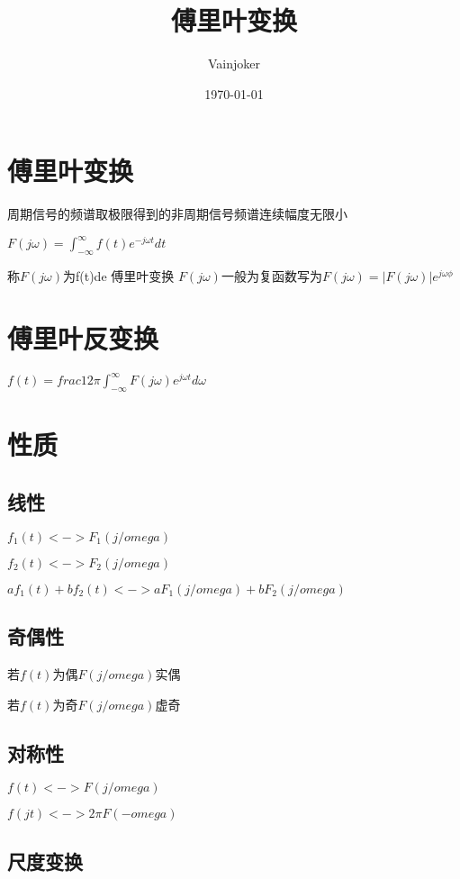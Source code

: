 \documentclass{article}
\title{傅里叶变换}
\author{Vainjoker}
\date{\today}
\begin{document}
    \maketitle
    \newpage


\section{傅里叶变换}

周期信号的频谱取极限得到的非周期信号频谱连续幅度无限小

$F(j\omega)=\int_{-\infty}^{\infty}f(t)e^{-j\omega t}dt$
   
称$F(j\omega)$为f(t)de 傅里叶变换
$F(j\omega)$一般为复函数写为$F(j\omega)=|F(j\omega)|e^{j\omega \phi}$

\section{傅里叶反变换}

$f(t)=frac{1}{2\pi}\int_{-\infty}^{\infty}F(j\omega)e^{j\omega t} d\omega$

\section{性质}

\subsection{线性}


$f_1(t)<->F_1(j/omega)$

$f_2(t)<->F_2(j/omega)$

$af_1(t)+bf_2(t)<->aF_1(j/omega)+bF_2(j/omega)$

\subsection{奇偶性}

若$f(t)$为偶$F(j/omega)$实偶

若$f(t)$为奇$F(j/omega)$虚奇

\subsection{对称性}

$f(t)<->F(j/omega)$

$f(jt)<->2\pi F(-omega)$

\subsection{尺度变换}
\end{document}
